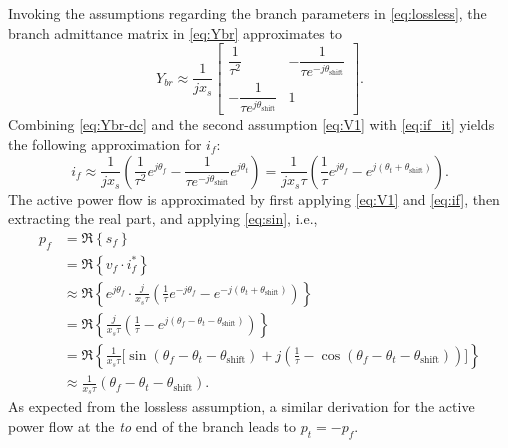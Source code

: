 \documentclass[12pt]{article}
\numberwithin{equation}{section}
\numberwithin{table}{section}
\numberwithin{figure}{section}
\begin{document}
Invoking the assumptions regarding the branch parameters in \eqref{eq:lossless},
the branch admittance matrix in \eqref{eq:Ybr} approximates to
\begin{equation}
  Y_{br} \approx \frac{1}{j x_s} \begin{bmatrix}
  \dfrac{1}{\tau^2} &
  - \dfrac{1}{\tau e^{-j\theta_\mathrm{shift}}} \\[0.5em]
  - \dfrac{1}{\tau e^{ j\theta_\mathrm{shift}}}
  & 1
  \label{eq:Ybr-dc}
\end{bmatrix}.
\end{equation}
Combining \eqref{eq:Ybr-dc} and the second assumption \eqref{eq:V1} with \eqref{eq:if_it}
yields the following approximation for $i_f$:
\begin{equation}
  i_f
  \approx \frac{1}{j x_s}
  \left(
    \frac{1}{\tau^2} e^{j \theta_f} - \frac{1}{\tau e^{-j \theta_\mathrm{shift}}} e^{j \theta_t}
  \right)
  = \frac{1}{j x_s \tau}
  \left(
    \frac{1}{\tau} e^{j \theta_f} - e^{j \left( \theta_t + \theta_\mathrm{shift} \right)}
  \right).
  \label{eq:if}
\end{equation}
The active power flow is approximated
by first applying \eqref{eq:V1} and \eqref{eq:if},
then extracting the real part,
and applying \eqref{eq:sin}, i.e.,
\begin{align}
  p_f
  & = \Re \left\{ s_f \right\} \nonumber\\
  & = \Re \left\{ v_f \cdot i_f^* \right\} \nonumber\\
  & \approx \Re \left\{
    e^{j \theta_f} \cdot \frac{j}{x_s \tau}
    \left( \frac{1}{\tau} e^{-j \theta_f} - e^{-j (\theta_t + \theta_\mathrm{shift})} \right)
  \right\} \nonumber\\
  & = \Re \left\{
    \frac{j}{x_s \tau}
    \left( \frac{1}{\tau} - e^{j (\theta_f - \theta_t - \theta_\mathrm{shift})} \right)
  \right\} \nonumber\\
  & = \Re \left\{
    \frac{1}{x_s \tau} \bigg[
        \sin( \theta_f - \theta_t - \theta_\mathrm{shift} )
        + j \left( \frac{1}{\tau} - \cos( \theta_f - \theta_t - \theta_\mathrm{shift} ) \right)
      \bigg]
    \right\} \nonumber\\
  & \approx \frac{1}{x_s \tau} ( \theta_f - \theta_t - \theta_\mathrm{shift} ).
\end{align}
As expected from the lossless assumption,
a similar derivation for the active power flow at the \emph{to} end of the branch leads to $p_t = -p_f$.
\end{document}
